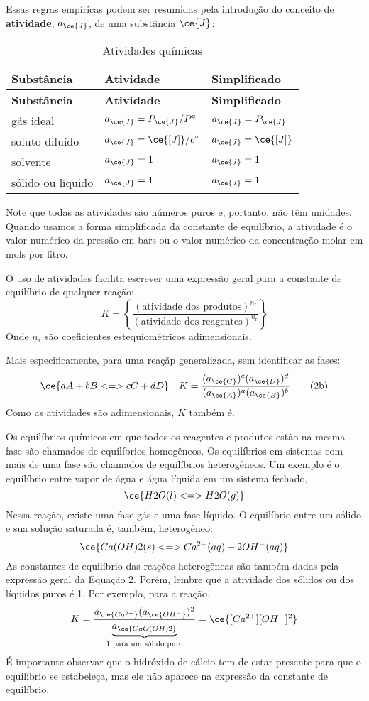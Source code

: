 Essas regras empíricas podem ser resumidas pela introdução do conceito de \textbf{atividade}, \(a_{\ce{J}}\), de uma substância \(\ce{J}\):

\begin{longtable}[]{@{}lll@{}}
\caption{Atividades químicas}\tabularnewline
\toprule\noalign{}
\textbf{Substância} & \textbf{Atividade} & \textbf{Simplificado} \\
\midrule\noalign{}
\endfirsthead
\toprule\noalign{}
\textbf{Substância} & \textbf{Atividade} & \textbf{Simplificado} \\
\midrule\noalign{}
\endhead
\bottomrule\noalign{}
\endlastfoot
gás ideal & \(a_{\ce{J}} = P_{\ce{J}}/P^\circ\) & \(a_{\ce{J}} = P_{\ce{J}}\) \\
soluto diluído & \(a_{\ce{J}} = \ce{[J]}/c^\circ\) & \(a_{\ce{J}} = \ce{[J]}\) \\
solvente & \(a_{\ce{J}} = 1\) & \(a_{\ce{J}} = 1\) \\
sólido ou líquido & \(a_{\ce{J}} = 1\) & \(a_{\ce{J}} = 1\) \\
\end{longtable}

Note que todas as atividades são números puros e, portanto, não têm unidades. Quando usamos a forma simplificada da constante de equilíbrio, a
atividade é o valor numérico da pressão em bars ou o valor numérico da concentração molar em mols por litro.

O uso de atividades facilita escrever uma expressão geral para a constante de equilíbrio de qualquer reação: \[
    K = \left\{ \dfrac{ (\text{atividade dos produtos})^{n_\mathrm{r}} }{ (\text{atividade dos reagentes})^{n_\mathrm{r}} } \right\}
\tag{2a}
\] Onde \(n_\mathrm{r}\) são coeficientes estequiométricos adimensionais.

Mais especificamente, para uma reaçãp generalizada, sem identificar as fases: \[
    \ce{a A + b B <=> c C + d D } 
        \quad K = \dfrac{ (a_{\ce{C}})^c (a_{\ce{D}})^d }{ (a_{\ce{A}})^a (a_{\ce{B}})^b }
\tag{2b}
\] Como as atividades são adimensionais, \(K\) também é.

Os equilíbrios químicos em que todos os reagentes e produtos estão na mesma fase são chamados de equilíbrios homogêneos. Os equilíbrios em sistemas
com mais de uma fase são chamados de equilíbrios heterogêneos. Um exemplo é o equilíbrio entre vapor de água e água líquida em um sistema fechado, \[
    \ce{ H2O(l) <=> H2O(g) }
\] Nessa reação, existe uma fase gás e uma fase líquido. O equilíbrio entre um sólido e sua solução saturada é, também, heterogêneo: \[
    \ce{ Ca(OH)2(s) <=> Ca^{2+}(aq) + 2 OH^-(aq) }
\] As constantes de equilíbrio das reações heterogêneas são também dadas pela expressão geral da Equação 2. Porém, lembre que a atividade dos sólidos
ou dos líquidos puros é 1. Por exemplo, para a reação, \[
    K = \dfrac{ a_{\ce{Ca^{2+}}} (a_{\ce{OH^-}})^2 }{ \underbrace{ a_{\ce{CaO(OH)2}} }_{ \text{1 para um sólido puro} } } 
        = \ce{ [Ca^{2+}][OH^-]^2 }
\] É importante observar que o hidróxido de cálcio tem de estar presente para que o equilíbrio se estabeleça, mas ele não aparece na expressão da
constante de equilíbrio.

